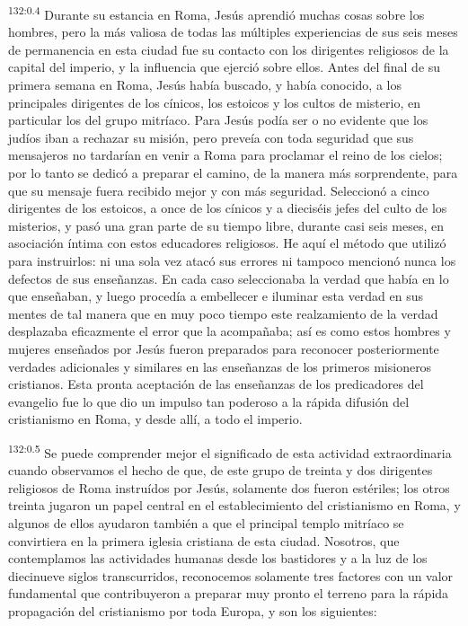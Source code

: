 \par
\textsuperscript{132:0.4} Durante su estancia en Roma, Jesús aprendió muchas cosas sobre los hombres, pero la más valiosa de todas las múltiples experiencias de sus seis meses de permanencia en esta ciudad fue su contacto con los dirigentes religiosos de la capital del imperio, y la influencia que ejerció sobre ellos. Antes del final de su primera semana en Roma, Jesús había buscado, y había conocido, a los principales dirigentes de los cínicos, los estoicos y los cultos de misterio, en particular los del grupo mitríaco. Para Jesús podía ser o no evidente que los judíos iban a rechazar su misión, pero preveía con toda seguridad que sus mensajeros no tardarían en venir a Roma para proclamar el reino de los cielos; por lo tanto se dedicó a preparar el camino, de la manera más sorprendente, para que su mensaje fuera recibido mejor y con más seguridad. Seleccionó a cinco dirigentes de los estoicos, a once de los cínicos y a dieciséis jefes del culto de los misterios, y pasó una gran parte de su tiempo libre, durante casi seis meses, en asociación íntima con estos educadores religiosos. He aquí el método que utilizó para instruirlos: ni una sola vez atacó sus errores ni tampoco mencionó nunca los defectos de sus enseñanzas. En cada caso seleccionaba la verdad que había en lo que enseñaban, y luego procedía a embellecer e iluminar esta verdad en sus mentes de tal manera que en muy poco tiempo este realzamiento de la verdad desplazaba eficazmente el error que la acompañaba; así es como estos hombres y mujeres enseñados por Jesús fueron preparados para reconocer posteriormente verdades adicionales y similares en las enseñanzas de los primeros misioneros cristianos. Esta pronta aceptación de las enseñanzas de los predicadores del evangelio fue lo que dio un impulso tan poderoso a la rápida difusión del cristianismo en Roma, y desde allí, a todo el imperio.

\par
\textsuperscript{132:0.5} Se puede comprender mejor el significado de esta actividad extraordinaria cuando observamos el hecho de que, de este grupo de treinta y dos dirigentes religiosos de Roma instruídos por Jesús, solamente dos fueron estériles; los otros treinta jugaron un papel central en el establecimiento del cristianismo en Roma, y algunos de ellos ayudaron también a que el principal templo mitríaco se convirtiera en la primera iglesia cristiana de esta ciudad. Nosotros, que contemplamos las actividades humanas desde los bastidores y a la luz de los diecinueve siglos transcurridos, reconocemos solamente tres factores con un valor fundamental que contribuyeron a preparar muy pronto el terreno para la rápida propagación del cristianismo por toda Europa, y son los siguientes:

